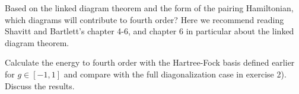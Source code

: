 \documentclass[prc]{revtex4} \usepackage[dvips]{graphicx}
\begin{document}
\begin{enumerate}
Based on the linked diagram theorem and the form of the pairing Hamiltonian, which diagrams will contribute
to fourth order?  Here we recommend reading Shavitt and Bartlett's chapter 4-6, and chapter 6 in particular about the linked diagram theorem.

Calculate the energy to fourth order with the Hartree-Fock basis defined earlier for $g\in [-1,1]$ and compare
with the full diagonalization case in exercise 2). Discuss the results.
\end{enumerate}



 
\end{document}
